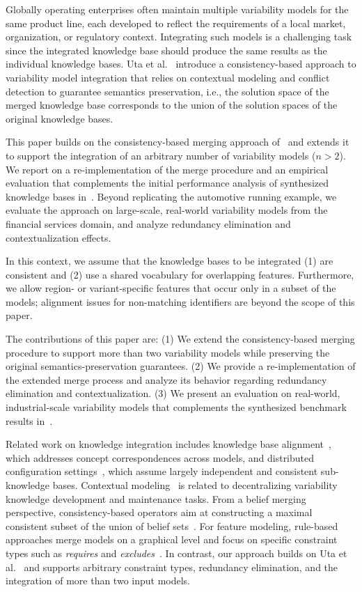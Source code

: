 \documentclass{ceurart}
\begin{document}
Globally operating enterprises often maintain multiple variability models for the same product line, each developed to reflect the requirements of a local market, organization, or regulatory context. Integrating such models is a challenging task since the integrated knowledge base should produce the same results as the individual knowledge bases. Uta et al.~\cite{Uta2019} introduce a consistency-based approach to variability model integration that relies on contextual modeling and conflict detection to guarantee semantics preservation, i.e., the solution space of the merged knowledge base corresponds to the union of the solution spaces of the original knowledge bases.

This paper builds on the consistency-based merging approach of~\cite{Uta2019} and extends it to support the integration of an arbitrary number of variability models ($n>2$). We report on a re-implementation of the merge procedure and an empirical evaluation that complements the initial performance analysis of synthesized knowledge bases in~\cite{Uta2019}. Beyond replicating the automotive running example, we evaluate the approach on large-scale, real-world variability models from the financial services domain, and analyze redundancy elimination and contextualization effects.

In this context, we assume that the knowledge bases to be integrated (1) are consistent and (2) use a shared vocabulary for overlapping features. Furthermore, we allow region- or variant-specific features that occur only in a subset of the models; alignment issues for non-matching identifiers are beyond the scope of this paper.

The contributions of this paper are: (1) We extend the consistency-based merging procedure to support more than two variability models while preserving the original semantics-preservation guarantees. (2) We provide a re-implementation of the extended merge process and analyze its behavior regarding redundancy elimination and contextualization. (3) We present an evaluation on real-world, industrial-scale variability models that complements the synthesized benchmark results in~\cite{Uta2019}.

\smallskip
Related work on knowledge integration includes knowledge base alignment~\cite{Galarraga2013}, which addresses concept correspondences across models, and distributed configuration settings~\cite{Ardissono2003}, which assume largely independent and consistent sub-knowledge bases. Contextual modeling~\cite{Felfernig2000} is related to decentralizing variability knowledge development and maintenance tasks. From a belief merging perspective, consistency-based operators aim at constructing a maximal consistent subset of the union of belief sets~\cite{Liberatore1998,Delgrande2007}. For feature modeling, rule-based approaches merge models on a graphical level and focus on specific constraint types such as \emph{requires} and \emph{excludes}~\cite{Broek2010,Segura2007}. In contrast, our approach builds on Uta et al.~\cite{Uta2019} and supports arbitrary constraint types, redundancy elimination, and the integration of more than two input models.
\end{document}
